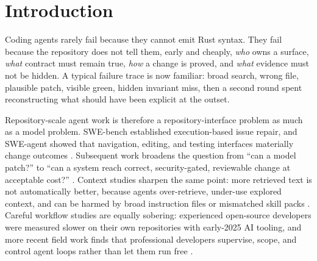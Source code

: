 \documentclass[conference]{IEEEtran}
\begin{document}
\clearpage

\section{Introduction}
Coding agents rarely fail because they cannot emit Rust syntax. They fail because the repository does not tell them, early and cheaply, \emph{who} owns a surface, \emph{what} contract must remain true, \emph{how} a change is proved, and \emph{what} evidence must not be hidden. A typical failure trace is now familiar: broad search, wrong file, plausible patch, visible green, hidden invariant miss, then a second round spent reconstructing what should have been explicit at the outset.

Repository-scale agent work is therefore a repository-interface problem as much as a model problem. SWE-bench established execution-based issue repair, and SWE-agent showed that navigation, editing, and testing interfaces materially change outcomes \cite{sweBench2024,sweAgent2024}. Subsequent work broadens the question from ``can a model patch?'' to ``can a system reach correct, security-gated, reviewable change at acceptable cost?'' \cite{sweEffi2025,susvibes2025}. Context studies sharpen the same point: more retrieved text is not automatically better, because agents over-retrieve, under-use explored context, and can be harmed by broad instruction files or mismatched skill packs \cite{contextBench2026,agentsMdEval2026}. Careful workflow studies are equally sobering: experienced open-source developers were measured slower on their own repositories with early-2025 AI tooling, and more recent field work finds that professional developers supervise, scope, and control agent loops rather than let them run free \cite{metrProductivity2025,professionalControl2025}.
\end{document}
